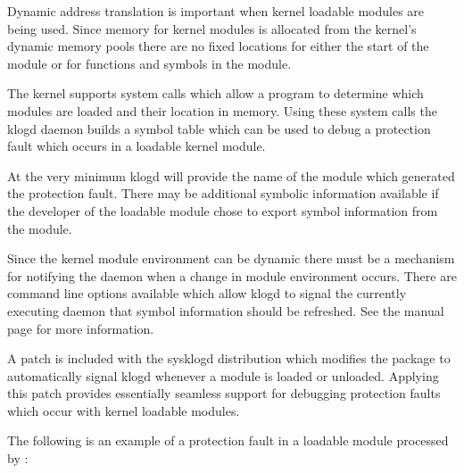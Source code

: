 \documentclass[a4paper,8pt,english]{sphinxmanual}
\begin{document}
Dynamic address translation is important when kernel loadable modules
are being used.  Since memory for kernel modules is allocated from the
kernel's dynamic memory pools there are no fixed locations for either
the start of the module or for functions and symbols in the module.

The kernel supports system calls which allow a program to determine
which modules are loaded and their location in memory.  Using these
system calls the klogd daemon builds a symbol table which can be used
to debug a protection fault which occurs in a loadable kernel module.

At the very minimum klogd will provide the name of the module which
generated the protection fault.  There may be additional symbolic
information available if the developer of the loadable module chose to
export symbol information from the module.

Since the kernel module environment can be dynamic there must be a
mechanism for notifying the  daemon when a change in module
environment occurs.  There are command line options available which
allow klogd to signal the currently executing daemon that symbol
information should be refreshed.  See the  manual page for more
information.

A patch is included with the sysklogd distribution which modifies the
 package to automatically signal klogd whenever a module
is loaded or unloaded.  Applying this patch provides essentially
seamless support for debugging protection faults which occur with
kernel loadable modules.

The following is an example of a protection fault in a loadable module
processed by :
\end{document}
